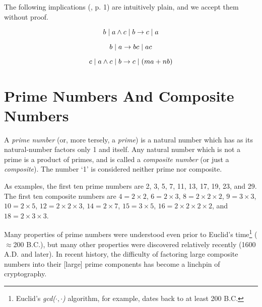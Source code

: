 The following implications (\cite{bibref:b:HardyAndWrightClassic}, p. 1)
are intuitively plain, and we accept them without proof.

\begin{equation}
b \mid a \wedge c \mid b \to c \mid a
\end{equation}

\begin{equation}
b \mid a \to b c \mid a c
\end{equation}

\begin{equation}
c \mid a \wedge c \mid b \to c \mid (m a + n b)
\end{equation}


\section{Prime Numbers And Composite Numbers}
\label{cpri0:pnc0}

A \emph{prime number} (or, more tersely, a \emph{prime})
is a natural number
which has as its natural-number factors only 1 and itself.
Any natural number which is not a prime is a product of primes, and is called
a \emph{composite number} (or just a \emph{composite}).
The number `1' is considered neither prime nor composite.

As examples, the first ten prime numbers are 2, 3, 5, 7, 11,
13, 17, 19, 23, and 29.  The first ten composite numbers are
$4 = 2 \times 2$,
$6 = 2 \times 3$,
$8 = 2 \times 2 \times 2$,
$9 = 3 \times 3$,
$10 = 2 \times 5$,
$12 = 2 \times 2 \times 3$,
$14 = 2 \times 7$,
$15 = 3 \times 5$,
$16 = 2 \times 2 \times 2 \times 2$,
and $18 = 2 \times 3 \times 3$.

Many properties of prime numbers were understood even prior
to Euclid's time\footnote{Euclid's \emph{gcd($\cdot{},\cdot{}$)} algorithm, for example,
dates back to at least 200 B.C.} ($\approx$200 B.C.), but many other properties
were discovered relatively recently (1600 A.D. and later).  In recent history,
the difficulty of factoring large composite numbers into their [large] prime
components has become a linchpin of cryptography.


